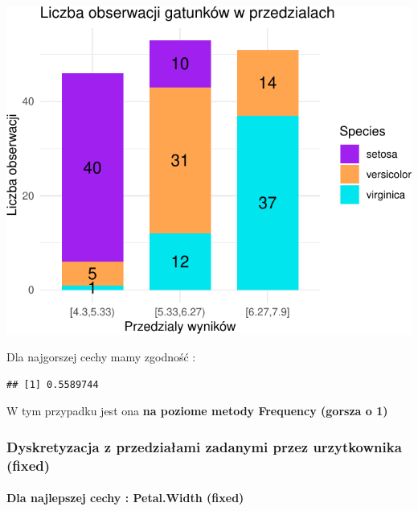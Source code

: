 \documentclass[
  12pt,
]{article}
\begin{document}
\begin{center}\includegraphics{Sprawozdanie2_files/figure-latex/tabela_kondygnacji_3_najg-1} \end{center}

Dla najgorszej cechy mamy zgodność :

\begin{verbatim}
## [1] 0.5589744
\end{verbatim}

W tym przypadku jest ona \textbf{na poziome metody Frequency (gorsza o
1)}

\subsubsection{Dyskretyzacja z przedziałami zadanymi przez urzytkownika
(fixed)}\label{dyskretyzacja-z-przedziaux142ami-zadanymi-przez-urzytkownika-fixed}

\paragraph{Dla najlepszej cechy : Petal.Width
(fixed)}\label{dla-najlepszej-cechy-petal.width-fixed}
\end{document}

